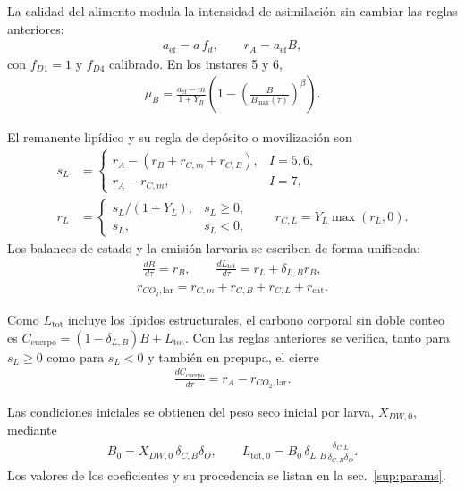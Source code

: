 La calidad del alimento modula la intensidad de asimilación sin cambiar
las reglas anteriores:
\begin{align*}
a_{\mathrm{ef}}=a\,f_d,
\qquad
r_A=a_{\mathrm{ef}}B,
\end{align*}
con $f_{D1}=1$ y $f_{D4}$ calibrado. En los instares 5 y 6,
\begin{align*}
\mu_B=\frac{a_{\mathrm{ef}}-m}{1+Y_B}
       \left(1-\left(\frac{B}{B_{\max}(\tau)}\right)^{\beta}\right).
\end{align*}

El remanente lipídico y su regla de depósito o movilización son
\begin{align*}
s_L &=
\begin{cases}
r_A-(r_B+r_{C,m}+r_{C,B}), & I=5,6,\\
r_A-r_{C,m}, & I=7,
\end{cases}\\
r_L &=
\begin{cases}
s_L/(1+Y_L), & s_L\geq 0,\\
s_L, & s_L<0,
\end{cases}
\qquad r_{C,L}=Y_L\max(r_L,0).
\end{align*}
Los balances de estado y la emisión larvaria se escriben de forma unificada:
\begin{align*}
\frac{dB}{d\tau}=r_B,\qquad
\frac{dL_{\mathrm{tot}}}{d\tau}=r_L+\delta_{L,B}r_B,
\end{align*}
\begin{align*}
r_{CO_2,\mathrm{lar}}
  =r_{C,m}+r_{C,B}+r_{C,L}+r_{\mathrm{cat}}.
\end{align*}

Como $L_{\mathrm{tot}}$ incluye los lípidos estructurales, el carbono
corporal sin doble conteo es
$C_{\mathrm{cuerpo}}=(1-\delta_{L,B})B+L_{\mathrm{tot}}$. Con las reglas
anteriores se verifica, tanto para $s_L\geq0$ como para $s_L<0$ y también en
prepupa, el cierre
\begin{align*}
\frac{dC_{\mathrm{cuerpo}}}{d\tau}
  =r_A-r_{CO_2,\mathrm{lar}}.
\end{align*}

Las condiciones iniciales se obtienen del peso seco inicial por larva,
$X_{DW,0}$, mediante
\begin{align*}
B_0=X_{DW,0}\,\delta_{C,B}\delta_O,
\qquad
L_{\mathrm{tot},0}
  =B_0\,\delta_{L,B}
   \frac{\delta_{C,L}}{\delta_{C,B}\delta_O}.
\end{align*}
Los valores de los coeficientes y su procedencia se listan en la
sec.~\ref{sup:params}.

